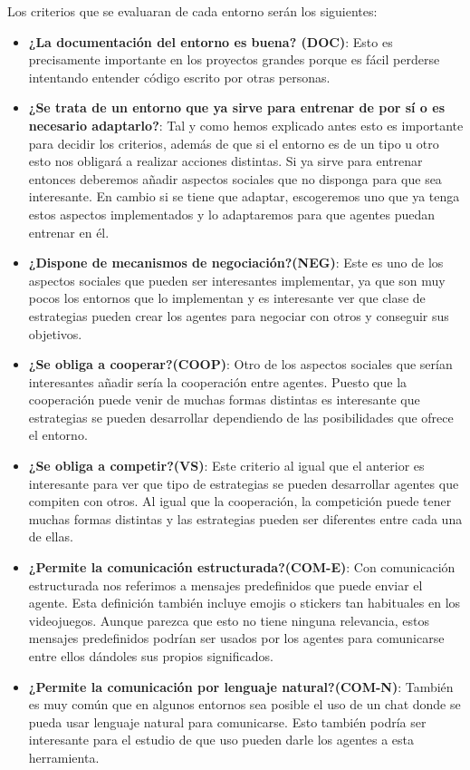 Los criterios que se evaluaran de cada entorno serán los siguientes:
\begin{itemize}
    \item \textbf{¿La documentación del entorno es buena? (DOC)}: Esto es precisamente importante en los proyectos grandes porque es fácil perderse intentando entender código escrito por otras personas.
    \item \textbf{¿Se trata de un entorno que ya sirve para entrenar de por sí o es necesario adaptarlo?}: Tal y como hemos explicado antes esto es importante para decidir los criterios, además de que si el entorno es de un tipo u otro esto nos obligará a realizar acciones distintas. Si ya sirve para entrenar entonces deberemos añadir aspectos sociales que no disponga para que sea interesante. En cambio si se tiene que adaptar, escogeremos uno que ya tenga estos aspectos implementados y lo adaptaremos para que agentes puedan entrenar en él.
    \item \textbf{¿Dispone de mecanismos de negociación?(NEG)}: Este es uno de los aspectos sociales que pueden ser interesantes implementar, ya que son muy pocos los entornos que lo implementan y es interesante ver que clase de estrategias pueden crear los agentes para negociar con otros y conseguir sus objetivos.
    \item \textbf{¿Se obliga a cooperar?(COOP)}: Otro de los aspectos sociales que serían interesantes añadir sería la cooperación entre agentes. Puesto que la cooperación puede venir de muchas formas distintas es interesante que estrategias se pueden desarrollar dependiendo de las posibilidades que ofrece el entorno.
    \item \textbf{¿Se obliga a competir?(VS)}: Este criterio al igual que el anterior es interesante para ver que tipo de estrategias se pueden desarrollar agentes que compiten con otros. Al igual que la cooperación, la competición puede tener muchas formas distintas y las estrategias pueden ser diferentes entre cada una de ellas.
    \item \textbf{¿Permite la comunicación estructurada?(COM-E)}: Con comunicación estructurada nos referimos a mensajes predefinidos que puede enviar el agente. Esta definición también incluye emojis o stickers tan habituales en los videojuegos. Aunque parezca que esto no tiene ninguna relevancia, estos mensajes predefinidos podrían ser usados por los agentes para comunicarse entre ellos dándoles sus propios significados.
    \item \textbf{¿Permite la comunicación por lenguaje natural?(COM-N)}: También es muy común que en algunos entornos sea posible el uso de un chat donde se pueda usar lenguaje natural para comunicarse. Esto también podría ser interesante para el estudio de que uso pueden darle los agentes a esta herramienta.

\end{itemize}
